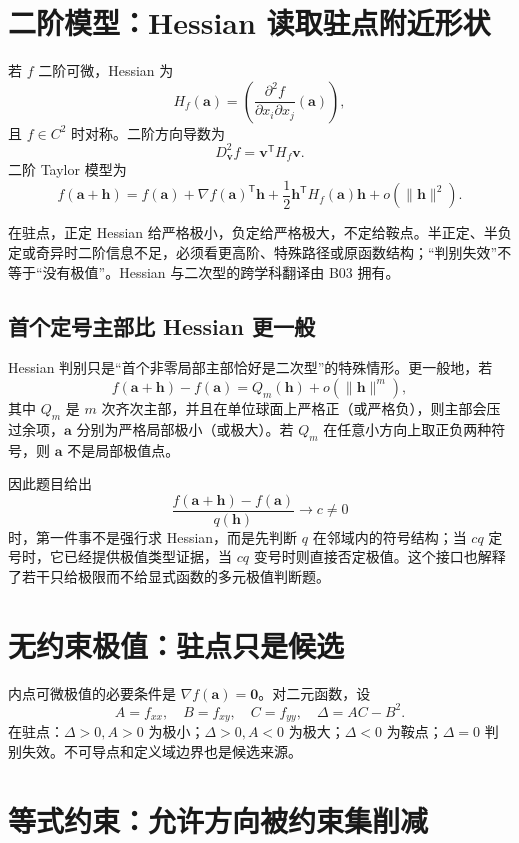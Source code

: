\documentclass[11pt,a4paper,fontset=fandol]{ctexart}
\begin{document}
\section{二阶模型：Hessian 读取驻点附近形状}

若 $f$ 二阶可微，Hessian 为
\[
H_f(\mathbf a)=\left(\frac{\partial^2f}{\partial x_i\partial x_j}(\mathbf a)\right),
\]
且 $f\in C^2$ 时对称。二阶方向导数为
\[
D_{\mathbf v}^2f=\mathbf v^{\mathsf T}H_f\mathbf v.
\]
二阶 Taylor 模型为
\[
f(\mathbf a+\mathbf h)
=f(\mathbf a)+{\nabla f(\mathbf a)}^{\mathsf T}\mathbf h
+\frac12\mathbf h^{\mathsf T}H_f(\mathbf a)\mathbf h
+o(\lVert\mathbf h\rVert^2).
\]

在驻点，正定 Hessian 给严格极小，负定给严格极大，不定给鞍点。半正定、半负定或奇异时二阶信息不足，必须看更高阶、特殊路径或原函数结构；“判别失效”不等于“没有极值”。Hessian 与二次型的跨学科翻译由 B03 拥有。

\subsection{首个定号主部比 Hessian 更一般}
Hessian 判别只是“首个非零局部主部恰好是二次型”的特殊情形。更一般地，若
\[
f(\mathbf a+\mathbf h)-f(\mathbf a)
=Q_m(\mathbf h)+o(\lVert\mathbf h\rVert^m),
\]
其中 $Q_m$ 是 $m$ 次齐次主部，并且在单位球面上严格正（或严格负），则主部会压过余项，$\mathbf a$ 分别为严格局部极小（或极大）。若 $Q_m$ 在任意小方向上取正负两种符号，则 $\mathbf a$ 不是局部极值点。

因此题目给出
\[
\frac{f(\mathbf a+\mathbf h)-f(\mathbf a)}{q(\mathbf h)}\to c\ne0
\]
时，第一件事不是强行求 Hessian，而是先判断 $q$ 在邻域内的符号结构；当 $cq$ 定号时，它已经提供极值类型证据，当 $cq$ 变号时则直接否定极值。这个接口也解释了若干只给极限而不给显式函数的多元极值判断题。

\section{无约束极值：驻点只是候选}

内点可微极值的必要条件是 $\nabla f(\mathbf a)=\mathbf0$。对二元函数，设
\[
A=f_{xx},\quad B=f_{xy},\quad C=f_{yy},\quad \Delta=AC-B^2.
\]
在驻点：$\Delta>0,A>0$ 为极小；$\Delta>0,A<0$ 为极大；$\Delta<0$ 为鞍点；$\Delta=0$ 判别失效。不可导点和定义域边界也是候选来源。

\section{等式约束：允许方向被约束集削减}
\end{document}
